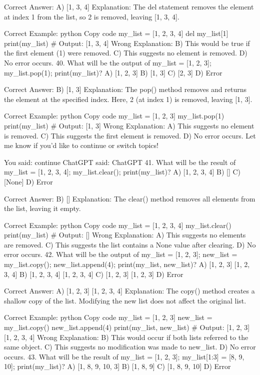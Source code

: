 Correct Answer: A) [1, 3, 4]
Explanation: The del statement removes the element at index 1 from the list, so 2 is removed, leaving [1, 3, 4].

Correct Example:
python
Copy code
my_list = [1, 2, 3, 4]
del my_list[1]
print(my_list)  # Output: [1, 3, 4]
Wrong Explanation:
B) This would be true if the first element (1) were removed.
C) This suggests no element is removed.
D) No error occurs.
40. What will be the output of my_list = [1, 2, 3]; my_list.pop(1); print(my_list)?
A) [1, 2, 3]
B) [1, 3]
C) [2, 3]
D) Error

Correct Answer: B) [1, 3]
Explanation: The pop() method removes and returns the element at the specified index. Here, 2 (at index 1) is removed, leaving [1, 3].

Correct Example:
python
Copy code
my_list = [1, 2, 3]
my_list.pop(1)
print(my_list)  # Output: [1, 3]
Wrong Explanation:
A) This suggests no element is removed.
C) This suggests the first element is removed.
D) No error occurs.
Let me know if you'd like to continue or switch topics!






You said:
continue
ChatGPT said:
ChatGPT
41. What will be the result of my_list = [1, 2, 3, 4]; my_list.clear(); print(my_list)?
A) [1, 2, 3, 4]
B) []
C) [None]
D) Error

Correct Answer: B) []
Explanation: The clear() method removes all elements from the list, leaving it empty.

Correct Example:
python
Copy code
my_list = [1, 2, 3, 4]
my_list.clear()
print(my_list)  # Output: []
Wrong Explanation:
A) This suggests no elements are removed.
C) This suggests the list contains a None value after clearing.
D) No error occurs.
42. What will be the output of my_list = [1, 2, 3]; new_list = my_list.copy(); new_list.append(4); print(my_list, new_list)?
A) [1, 2, 3] [1, 2, 3, 4]
B) [1, 2, 3, 4] [1, 2, 3, 4]
C) [1, 2, 3] [1, 2, 3]
D) Error

Correct Answer: A) [1, 2, 3] [1, 2, 3, 4]
Explanation: The copy() method creates a shallow copy of the list. Modifying the new list does not affect the original list.

Correct Example:
python
Copy code
my_list = [1, 2, 3]
new_list = my_list.copy()
new_list.append(4)
print(my_list, new_list)  # Output: [1, 2, 3] [1, 2, 3, 4]
Wrong Explanation:
B) This would occur if both lists referred to the same object.
C) This suggests no modification was made to new_list.
D) No error occurs.
43. What will be the result of my_list = [1, 2, 3]; my_list[1:3] = [8, 9, 10]; print(my_list)?
A) [1, 8, 9, 10, 3]
B) [1, 8, 9]
C) [1, 8, 9, 10]
D) Error

